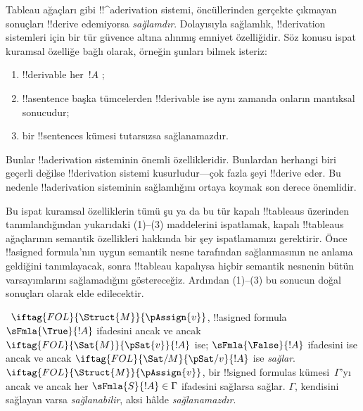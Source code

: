 \documentclass[../../../include/open-logic-section]{subfiles}
\begin{document}
      {}
      {}
      

\begin{explain}
Tableau ağaçları gibi !!^a{derivation} sistemi, öncüllerinden gerçekte
çıkmayan sonuçları !!{derive} edemiyorsa \emph{sağlamdır}. Dolayısıyla sağlamlık,
!!{derivation} sistemleri için bir tür güvence altına alınmış emniyet
özelliğidir. Söz konusu ispat kuramsal özelliğe bağlı olarak, örneğin şunları
bilmek isteriz:
\begin{enumerate}
\item !!{derivable} her~$!A$ ;
\item !!a{sentence} başka tümcelerden !!{derivable} ise aynı zamanda onların
  mantıksal sonucudur;
\item bir !!{sentence}s kümesi tutarsızsa sağlanamazdır.
\end{enumerate}
Bunlar !!a{derivation} sisteminin önemli özellikleridir. Bunlardan herhangi
biri geçerli değilse !!{derivation} sistemi kusurludur---çok fazla şeyi
!!{derive} eder. Bu nedenle !!a{derivation} sisteminin sağlamlığını ortaya
koymak son derece önemlidir.

Bu ispat kuramsal özelliklerin tümü şu ya da bu tür kapalı !!{tableau}s
üzerinden tanımlandığından yukarıdaki (1)--(3) maddelerini ispatlamak, kapalı
!!{tableau}s ağaçlarının semantik özellikleri hakkında bir şey
ispatlamamızı gerektirir. Önce !!a{signed formula}'nın uygun semantik nesne
tarafından sağlanmasının ne anlama geldiğini tanımlayacak, sonra !!{tableau}
kapalıysa hiçbir semantik nesnenin bütün varsayımlarını sağlamadığını göstereceğiz. Ardından
(1)--(3) bu sonucun doğal sonuçları olarak elde edilecektir.
\end{explain}

\begin{defn}
~$\iftag{FOL}{\Struct{M}}{\pAssign{v}}$,
!!a{signed formula} $\sFmla{\True}{!A}$ ifadesini ancak ve ancak
$\iftag{FOL}{\Sat{M}}{\pSat{v}}{!A}$ ise; $\sFmla{\False}{!A}$ ifadesini
ise ancak ve ancak $\iftag{FOL}{\Sat/{M}}{\pSat/{v}}{!A}$ ise
\emph{sağlar}. $\iftag{FOL}{\Struct{M}}{\pAssign{v}}$, bir !!{signed
formula}s kümesi~$\Gamma$'yı ancak ve ancak her
$\sFmla{S}{!A} \in \Gamma$ ifadesini sağlarsa sağlar. $\Gamma$, kendisini
sağlayan  varsa
\emph{sağlanabilir}, aksi hâlde \emph{sağlanamazdır}.
\end{defn}
\end{document}
